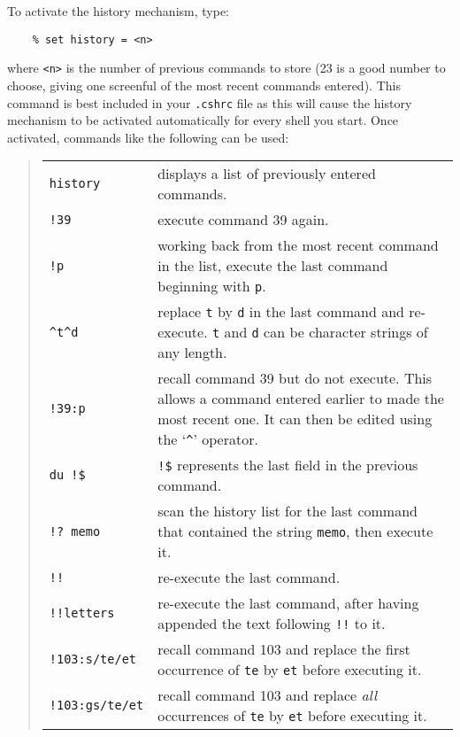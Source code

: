 To activate the history mechanism, type:
\begin{verbatim}
    % set history = <n>
\end{verbatim}
where {\tt <n>} is the number of previous commands to store (23 is a good
number to choose, giving one screenful of the most recent commands entered).
This command is best included in your {\tt .cshrc} file as this will cause
the history mechanism to be activated automatically for every shell you start.
Once activated, commands like the following can be used:
\begin{quote}
\begin{tabular}{lp{4.5in}}

{\tt history} & displays a list of previously entered commands.\\

{\tt  !39}    & execute command 39 again.\\
 
{\tt !p}      & working back from the most recent command in the list, execute
   the last command beginning with {\tt p}.\\

{\tt \verb+^t^d+} & replace {\tt t} by {\tt d} in the last command and
   re-execute.
   {\tt t} and {\tt d} can be character strings of any length.\\

{\tt !39:p}   & recall command 39 but do not execute.
   This allows a command entered earlier to made the most recent one.
   It can then be edited using the `\verb+^+' operator.\\

{\tt du !\$}  & {\tt !\$} represents the last field in the previous command.\\

{\tt !? memo} & scan the history list for the last command that contained the
               string {\tt memo}, then execute it.\\

{\tt !!}      & re-execute the last command.\\

{\tt !!letters}  & re-execute the last command, after having appended the text
    following {\tt !!} to it.\\

{\tt !103:s/te/et} & recall command 103 and replace the first occurrence of
                     {\tt te} by {\tt et} before executing it.\\

{\tt !103:gs/te/et} & recall command 103 and replace {\it all}\, occurrences
              of {\tt te} by {\tt et} before executing it.

\end{tabular}
\end{quote}

